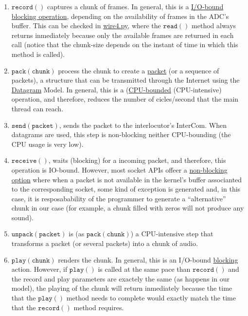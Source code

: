 \begin{enumerate}
\item $\mathtt{record()}$ captures a chunk of frames. In general, this
  is a \href{https://en.wikipedia.org/wiki/I/O_bound}{I/O-bound}
  \href{https://python-sounddevice.readthedocs.io/en/0.4.0/api/streams.html#sounddevice.Stream.read}{blocking
    operation}, depending on the availability of frames in the ADC's
  buffer. This can be checked in
  \href{https://raw.githubusercontent.com/Tecnologias-multimedia/intercom/master/test/sounddevice/wire4.py}{wire4.py},
  where the $\mathtt{read()}$ method always returns inmediately
  because only the available frames are returned in each call (notice
  that the chunk-size depends on the instant of time in which this
  method is called).
\item $\mathtt{pack(chunk)}$ process the chunk to create a
  \href{https://en.wikipedia.org/wiki/Network_packet}{packet} (or a
  sequence of packets), a structure that can be transmitted through
  the Internet using the
  \href{https://en.wikipedia.org/wiki/Datagram}{Datagram} Model. In
  general, this is a
  (\href{https://en.wikipedia.org/wiki/CPU-bound}{CPU-bounded}
  (CPU-intensive) operation, and therefore, reduces the number of
  cicles/second that the main thread can reach.
\item $\mathtt{send(packet)}$, sends the packet to the interlocutor's
  InterCom. When datagrams are used, this step is non-blocking neither
  CPU-bounding (the CPU usage is very low).
\item $\mathtt{receive()}$, waits (blocking) for a incoming packet,
  and therefore, this operation is IO-bound. However, most socket APIs
  offeer a
  \href{https://docs.python.org/3.8/library/socket.html#socket.socket.setblocking}{non-blocking
    option} where when a packet is not available in the kernel's
  buffer associanted to the corresponding socket, some kind of
  exception is generated and, in this case, it is resposabability of
  the programmer to generate a ``alternative'' chunk in our case (for
  example, a chunk filled with zeros will not produce any sound).
\item $\mathtt{unpack(packet)}$ is (as $\mathtt{pack(chunk)}$) a
  CPU-intensive step that transforms a packet (or several packets)
  into a chunk of audio.
\item $\mathtt{play(chunk)}$ renders the chunk. In general, this is an
  I/O-bound
  \href{https://python-sounddevice.readthedocs.io/en/0.4.0/api/streams.html#sounddevice.Stream.write}{blocking}
  action. However, if $\mathtt{play()}$ is called at the same pace
  than $\mathtt{record()}$ and the record and play parameters are
  exactely the same (as happens in our model), the playing of the
  chunk will return inmediately because the time that the
  $\mathtt{play()}$ method needs to complete would exactly match the
  time that the $\mathtt{record()}$ method requires.
\end{enumerate}

